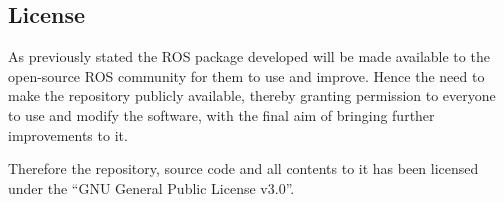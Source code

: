 \subsection{License}

As previously stated the ROS package developed will be made available to the open-source ROS community for them to use and improve. Hence the need to make the repository publicly available, thereby granting permission to everyone to use and modify the software, with the final aim of bringing further improvements to it.

Therefore the repository, source code and all contents to it has been licensed under the “GNU General Public License v3.0”.
